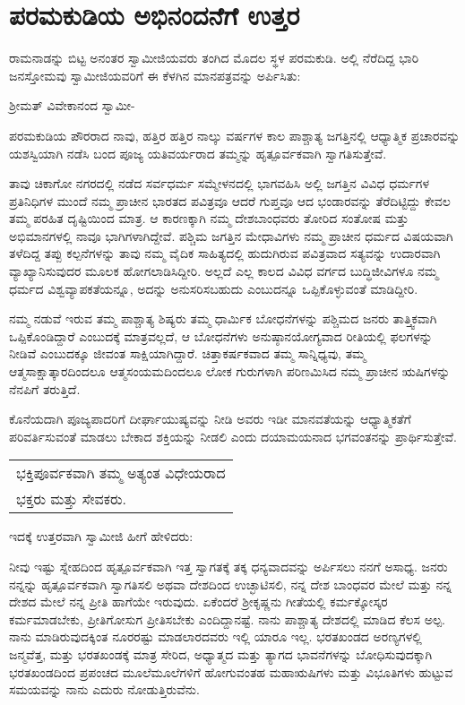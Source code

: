 
\chapter{ಪರಮಕುಡಿಯ ಅಭಿನಂದನೆಗೆ ಉತ್ತರ}

ರಾಮನಾಡನ್ನು ಬಿಟ್ಟ ಅನಂತರ ಸ್ವಾಮೀಜಿಯವರು ತಂಗಿದ ಮೊದಲ ಸ್ಥಳ ಪರಮಕುಡಿ. ಅಲ್ಲಿ ನೆರೆದಿದ್ದ ಭಾರಿ ಜನಸ್ತೋಮವು ಸ್ವಾಮೀಜಿಯವರಿಗೆ ಈ ಕೆಳಗಿನ ಮಾನಪತ್ರವನ್ನು ಅರ್ಪಿಸಿತು:

ಶ‍್ರೀಮತ್​ ವಿವೇಕಾನಂದ ಸ್ವಾಮೀ-

ಪರಮಕುಡಿಯ ಪೌರರಾದ ನಾವು, ಹತ್ತಿರ ಹತ್ತಿರ ನಾಲ್ಕು ವರ್ಷಗಳ ಕಾಲ ಪಾಶ್ಚಾತ್ಯ ಜಗತ್ತಿನಲ್ಲಿ ಆಧ್ಯಾತ್ಮಿಕ ಪ್ರಚಾರವನ್ನು ಯಶಸ್ವಿಯಾಗಿ ನಡೆಸಿ ಬಂದ ಪೂಜ್ಯ ಯತಿವರ್ಯರಾದ ತಮ್ಮನ್ನು ಹೃತ್ಪೂರ್ವಕವಾಗಿ ಸ್ವಾಗತಿಸುತ್ತೇವೆ.

ತಾವು ಚಿಕಾಗೋ ನಗರದಲ್ಲಿ ನಡೆದ ಸರ್ವಧರ್ಮ ಸಮ್ಮೇಳನದಲ್ಲಿ ಭಾಗವಹಿಸಿ ಅಲ್ಲಿ ಜಗತ್ತಿನ ವಿವಿಧ ಧರ್ಮಗಳ ಪ್ರತಿನಿಧಿಗಳ ಮುಂದೆ ನಮ್ಮ ಪ್ರಾಚೀನ ಭಾರತದ ಪವಿತ್ರವೂ ಆದರೆ ಗುಪ್ತವೂ ಆದ ಭಂಡಾರವನ್ನು ತೆರೆದಿಟ್ಟಿದ್ದು ಕೇವಲ ತಮ್ಮ ಪರಹಿತ ದೃಷ್ಟಿಯಿಂದ ಮಾತ್ರ. ಆ ಕಾರಣಕ್ಕಾಗಿ ನಮ್ಮ ದೇಶಬಾಂಧವರು ತೋರಿದ ಸಂತೋಷ ಮತ್ತು ಅಭಿಮಾನಗಳಲ್ಲಿ ನಾವೂ ಭಾಗಿಗಳಾಗಿದ್ದೇವೆ. ಪಶ್ಚಿಮ ಜಗತ್ತಿನ ಮೇಧಾವಿಗಳು ನಮ್ಮ ಪ್ರಾಚೀನ ಧರ್ಮದ ವಿಷಯವಾಗಿ ತಳೆದಿದ್ದ ತಪ್ಪು ಕಲ್ಪನೆಗಳನ್ನು ತಾವು ನಮ್ಮ ವೈದಿಕ ಸಾಹಿತ್ಯದಲ್ಲಿ ಹುದುಗಿರುವ ಪವಿತ್ರವಾದ ಸತ್ಯವನ್ನು ಉದಾರವಾಗಿ ವ್ಯಾಖ್ಯಾನಿಸುವುದರ ಮೂಲಕ ಹೋಗಲಾಡಿಸಿದ್ದೀರಿ. ಅಲ್ಲದೆ ಎಲ್ಲ ಕಾಲದ ವಿವಿಧ ವರ್ಗದ ಬುದ್ಧಿಜೀವಿಗಳೂ ನಮ್ಮ ಧರ್ಮದ ವಿಶ್ವವ್ಯಾಪಕತೆಯನ್ನೂ, ಅದನ್ನು ಅನುಸರಿಸಬಹುದು ಎಂಬುದನ್ನೂ ಒಪ್ಪಿಕೊಳ್ಳುವಂತೆ ಮಾಡಿದ್ದೀರಿ.

ನಮ್ಮ ನಡುವೆ ಇರುವ ತಮ್ಮ ಪಾಶ್ಚಾತ್ಯ ಶಿಷ್ಯರು ತಮ್ಮ ಧಾರ್ಮಿಕ ಬೋಧನೆಗಳನ್ನು ಪಶ್ಚಿಮದ ಜನರು ತಾತ್ತ್ವಿಕವಾಗಿ ಒಪ್ಪಿಕೊಂಡಿದ್ದಾರೆ ಎಂಬುದಕ್ಕೆ ಮಾತ್ರವಲ್ಲದೆ, ಆ ಬೋಧನೆಗಳು ಅನುಷ್ಠಾನಯೋಗ್ಯವಾದ ರೀತಿಯಲ್ಲಿ ಫಲಗಳನ್ನು ನೀಡಿವೆ ಎಂಬುದಕ್ಕೂ ಜೀವಂತ ಸಾಕ್ಷಿಯಾಗಿದ್ದಾರೆ. ಚಿತ್ತಾಕರ್ಷಕವಾದ ತಮ್ಮ ಸಾನ್ನಿಧ್ಯವು, ತಮ್ಮ ಆತ್ಮಸಾಕ್ಷಾತ್ಕಾರದಿಂದಲೂ ಆತ್ಮಸಂಯಮದಿಂದಲೂ ಲೋಕ ಗುರುಗಳಾಗಿ ಪರಿಣಮಿಸಿದ ನಮ್ಮ ಪ್ರಾಚೀನ ಋಷಿಗಳನ್ನು ನೆನಪಿಗೆ ತರುತ್ತಿದೆ.

ಕೊನೆಯದಾಗಿ ಪೂಜ್ಯಪಾದರಿಗೆ ದೀರ್ಘಾಯುಷ್ಯವನ್ನು ನೀಡಿ ಅವರು ಇಡೀ ಮಾನವತೆಯನ್ನು ಆಧ್ಯಾತ್ಮಿಕತೆಗೆ ಪರಿವರ್ತಿಸುವಂತೆ ಮಾಡಲು ಬೇಕಾದ ಶಕ್ತಿಯನ್ನು ನೀಡಲಿ ಎಂದು ದಯಾಮಯನಾದ ಭಗವಂತನನ್ನು ಪ್ರಾರ್ಥಿಸುತ್ತೇವೆ.

\begin{longtable}[r]{@{}l@{}}
ಭಕ್ತಿಪೂರ್ವಕವಾಗಿ ತಮ್ಮ ಅತ್ಯಂತ ವಿಧೇಯರಾದ \\
ಭಕ್ತರು ಮತ್ತು ಸೇವಕರು. \\
\end{longtable}

ಇದಕ್ಕೆ ಉತ್ತರವಾಗಿ ಸ್ವಾಮೀಜಿ ಹೀಗೆ ಹೇಳಿದರು:

ನೀವು ಇಷ್ಟು ಸ್ನೇಹದಿಂದ ಹೃತ್ಪೂರ್ವಕವಾಗಿ ಇತ್ತ ಸ್ವಾಗತಕ್ಕೆ ತಕ್ಕ ಧನ್ಯವಾದವನ್ನು ಅರ್ಪಿಸಲು ನನಗೆ ಅಸಾಧ್ಯ. ಜನರು ನನ್ನನ್ನು ಹೃತ್ಪೂರ್ವಕವಾಗಿ ಸ್ವಾಗತಿಸಲಿ ಅಥವಾ ದೇಶದಿಂದ ಉಚ್ಛಾಟಿಸಲಿ, ನನ್ನ ದೇಶ ಬಾಂಧವರ ಮೇಲೆ ಮತ್ತು ನನ್ನ ದೇಶದ ಮೇಲೆ ನನ್ನ ಪ್ರೀತಿ ಹಾಗೆಯೇ ಇರುವುದು. ಏಕೆಂದರೆ ಶ‍್ರೀಕೃಷ್ಣನು ಗೀತೆಯಲ್ಲಿ ಕರ್ಮಕ್ಕೋಸ್ಕರ ಕರ್ಮಮಾಡಬೇಕು, ಪ್ರೀತಿಗೋಸುಗ ಪ್ರೀತಿಸಬೇಕು ಎಂದಿದ್ದಾನಷ್ಟೆ. ನಾನು ಪಾಶ್ಚಾತ್ಯ ದೇಶದಲ್ಲಿ ಮಾಡಿದ ಕೆಲಸ ಅಲ್ಪ. ನಾನು ಮಾಡಿರುವುದಕ್ಕಿಂತ ನೂರರಷ್ಟು ಮಾಡಲಾರದವರು ಇಲ್ಲಿ ಯಾರೂ ಇಲ್ಲ. ಭರತಖಂಡದ ಅರಣ್ಯಗಳಲ್ಲಿ ಜನ್ಮವೆತ್ತ, ಮತ್ತು ಭರತಖಂಡಕ್ಕೆ ಮಾತ್ರ ಸೇರಿದ, ಅಧ್ಯಾತ್ಮದ ಮತ್ತು ತ್ಯಾಗದ ಭಾವನೆಗಳನ್ನು ಬೋಧಿಸುವುದಕ್ಕಾಗಿ ಭರತಖಂಡದಿಂದ ಪ್ರಪಂಚದ ಮೂಲೆಮೂಲೆಗಳಿಗೆ ಹೋಗುವಂತಹ ಮಹಾಋಷಿಗಳು ಮತ್ತು ವಿಭೂತಿಗಳು ಹುಟ್ಟುವ ಸಮಯವನ್ನು ನಾನು ಎದುರು ನೋಡುತ್ತಿರುವೆನು.

